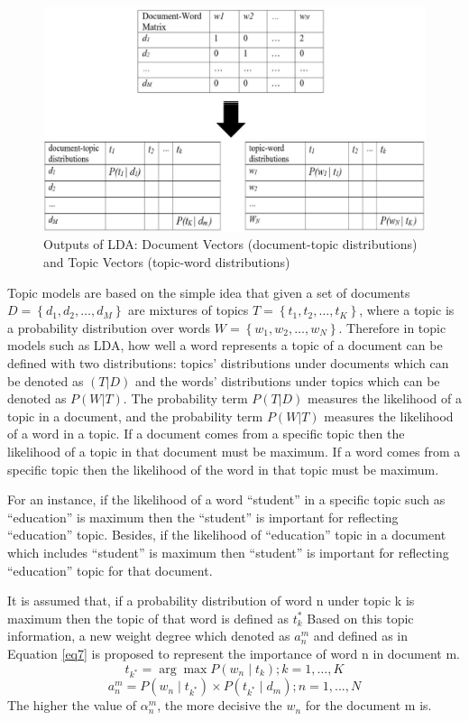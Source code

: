\documentclass[a4paper,fleqn]{cas-dc}
\begin{document}
\begin{figure}
	\centering
	\includegraphics[scale=.4]{figs/fig5.pdf}
	\caption{Outputs of LDA: Document Vectors (document-topic distributions) and Topic Vectors (topic-word distributions)}
	\label{fig5}
\end{figure}

Topic models are based on the simple idea that given a set of documents $D=\left\{d_1,d_2,…,d_M\right\}$ are mixtures of topics $T=\left\{t_1,t_2,…,t_K\right\}$, where a topic is a probability distribution over words $W=\left\{w_1,w_2,…,w_N\right\}$. Therefore in topic models such as LDA, how well a word represents a topic of a document can be defined with two distributions: topics’ distributions under documents which can be denoted as $(T|D)$ and the words' distributions under topics which can be denoted as $P(W|T)$. The probability term $P(T|D)$ measures the likelihood of a topic in a document, and the probability term $P(W|T)$ measures the likelihood of a word in a topic. If a document comes from a specific topic then the likelihood of a topic in that document must be maximum. If a word comes from a specific topic then the likelihood of the word in that topic must be maximum. 


For an instance, if the likelihood of a word “student” in a specific topic such as “education” is maximum then the “student” is important for reflecting “education” topic.  Besides, if the likelihood of “education” topic in a document which includes “student” is maximum then “student” is important for reflecting “education” topic for that document. 

It is assumed that, if a probability distribution of word n under topic k is maximum then the topic of that word is defined as $t_k^*$  Based on this topic information, a new weight degree which denoted as $a_n^m$ and defined as in Equation \ref{eq7} is proposed to represent the importance of word n in document m. 
\begin{equation}
\label{eq7}
t_{k^*}=\arg\max P(w_n \mid t_k ); k=1,…,K
\end{equation}
\[a_n^m= P(w_n \mid t_{k^*})\times P(t_{k^*}\mid d_m); n=1,...,N\]
The higher the value of $\alpha_n^m$, the more decisive the $w_n$ for the document m is. 
\end{document}
